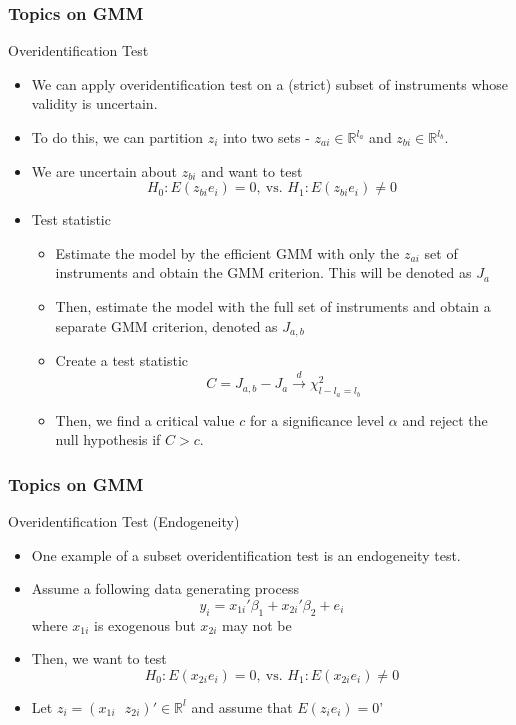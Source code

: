 \documentclass{beamer}
\begin{document}
\begin{frame}
\frametitle{Topics on GMM}
Overidentification Test
\begin{itemize}
\item We can apply overidentification test on a (strict) subset of instruments whose validity is uncertain.
\item To do this, we can partition $z_i$ into two sets - $z_{ai}\in\mathbb{R}^{l_a}$ and $z_{bi}\in\mathbb{R}^{l_b}$.
\item We are uncertain about $z_{bi}$ and want to test 
\[
H_0: E(z_{bi}e_i)=0, \ \text{vs. }H_1:E(z_{bi}e_i)\neq0
\]
\item Test statistic
\begin{itemize}
\item Estimate the model by the efficient GMM with only the $z_{ai}$ set of instruments and obtain the GMM criterion. This will be denoted as $J_a$
\item Then, estimate the model with the full set of instruments and obtain a separate GMM criterion, denoted as $J_{a,b}$
\item Create a test statistic
\[
C=J_{a,b}-J_a\xrightarrow{d}\chi^2_{l-l_a=l_b}
\]
\item Then, we find a critical value $c$ for a significance level $\alpha$ and reject the null hypothesis if $C>c$. 
\end{itemize}
\end{itemize}
\end{frame}

\begin{frame}
\frametitle{Topics on GMM}
Overidentification Test  (Endogeneity)
\begin{itemize}
\item One example of a subset overidentification test is an endogeneity test. 
\item Assume a following data generating process
\[
y_i=x_{1i}'\beta_1+x_{2i}'\beta_2+e_i
\]
where $x_{1i}$ is exogenous but $x_{2i}$ may not be
\item Then, we want to test
\[
H_0: E(x_{2i}e_i)=0, \ \text{vs. }H_1:E(x_{2i}e_i)\neq0
\]
\item Let $z_i = (x_{1i} \ \ \ z_{2i})'\in\mathbb{R}^{l}$ and assume that $E(z_ie_i)=0$'
\end{itemize}
\end{frame}
\end{document}
